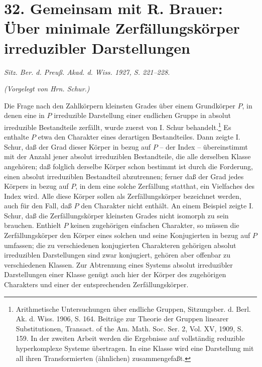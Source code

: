 \documentclass[11pt]{article}
\newcommand{\mat}[1]{\begin{pmatrix}#1\end{pmatrix}}
\begin{document}
\providecommand{\mat}[1]{\begin{pmatrix}#1\end{pmatrix}}


\setcounter{footnote}{0}

\section*{32. Gemeinsam mit R. Brauer: Über minimale Zerfällungskörper irreduzibler Darstellungen}
\emph{Sitz. Ber. d. Preuß. Akad. d. Wiss. 1927, S. 221--228.}

\begin{center}\emph{(Vorgelegt von Hrn. Schur.)}\end{center}

Die Frage nach den Zahlkörpern kleinsten Grades über einem Grundkörper $P$, in denen eine in $P$ irreduzible Darstellung einer endlichen Gruppe in absolut irreduzible Bestandteile zerfällt, wurde zuerst von I. Schur behandelt.\footnote{Arithmetische Untersuchungen über endliche Gruppen, Sitzungsber. d. Berl. Ak. d. Wiss. 1906, S. 164. Beiträge zur Theorie der Gruppen linearer Substitutionen, Transact. of the Am. Math. Soc. Ser. 2, Vol. XV, 1909, S. 159. In der zweiten Arbeit werden die Ergebnisse auf vollständig reduzible hyperkomplexe Systeme übertragen. In eine Klasse wird eine Darstellung mit all ihren Transformierten (ähnlichen) zusammengefaßt.} Es enthalte $P$ etwa den Charakter eines derartigen Bestandteiles. Dann zeigte I. Schur, daß der Grad dieser Körper in bezug auf $P$ -- der Index -- übereinstimmt mit der Anzahl jener absolut irreduziblen Bestandteile, die alle derselben Klasse angehören; daß folglich derselbe Körper schon bestimmt ist durch die Forderung, einen absolut irreduziblen Bestandteil abzutrennen; ferner daß der Grad jedes Körpers in bezug auf $P$, in dem eine solche Zerfällung statthat, ein Vielfaches des Index wird. Alle diese Körper sollen als Zerfällungskörper bezeichnet werden, auch für den Fall, daß $P$ den Charakter nicht enthält. An einem Beispiel zeigte I. Schur, daß die Zerfällungskörper kleinsten Grades nicht isomorph zu sein brauchen. Enthielt $P$ keinen zugehörigen einfachen Charakter, so müssen die Zerfällungskörper den Körper eines solchen und seine Konjugierten in bezug auf $P$ umfassen; die zu verschiedenen konjugierten Charakteren gehörigen absolut irreduziblen Darstellungen sind zwar konjugiert, gehören aber offenbar zu verschiedenen Klassen. Zur Abtrennung eines Systems absolut irreduzibler Darstellungen einer Klasse genügt auch hier der Körper des zugehörigen Charakters und einer der entsprechenden Zerfällungskörper.
\end{document}
